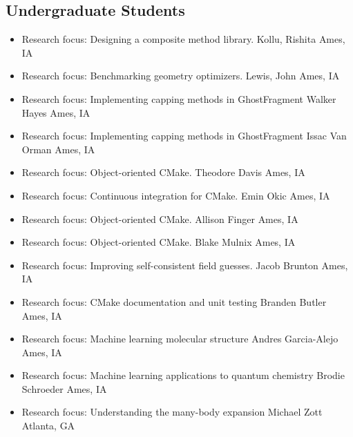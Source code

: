 \documentclass[11pt,a4paper,sans]{moderncv}
\begin{document}
\subsection{Undergraduate Students}
\begin{itemize}
	\item{
		{Research focus: Designing a composite method library.}
		{Kollu, Rishita}
		{Ames, IA}
		{}{}
	}
	\item{
		{Research focus: Benchmarking geometry optimizers.}
		{Lewis, John}
		{Ames, IA}
		{}{}
	}
	\item{
		{Research focus: Implementing capping methods in GhostFragment}
		{Walker Hayes}
		{Ames, IA}
		{}{}
	}
	\item{
		{Research focus: Implementing capping methods in GhostFragment}
		{Issac Van Orman}
		{Ames, IA}
		{}{}
	}
	\item{
		{Research focus: Object-oriented CMake.}
		{Theodore Davis}
		{Ames, IA}
		{}{}
	}
	\item{
		{Research focus: Continuous integration for CMake.}
		{Emin Okic}
		{Ames, IA}
		{}{}
	}
	\item{
		{Research focus: Object-oriented CMake.}
		{Allison Finger}
		{Ames, IA}
		{}{}
	}
	\item{
		{Research focus: Object-oriented CMake.}
		{Blake Mulnix}
		{Ames, IA}
		{}{}
	}
	\item{
		{Research focus: Improving self-consistent field guesses.}
		{Jacob Brunton}
		{Ames, IA}
		{}{}
	}
	\item{
		{Research focus: CMake documentation and unit testing}
		{Branden Butler}
		{Ames, IA}
		{}{}
	}
	\item{
		{Research focus: Machine learning molecular structure}
		{Andres Garcia-Alejo}
		{Ames, IA}
		{}{}
	}
	\item{
		{Research focus: Machine learning applications to quantum chemistry}
		{Brodie Schroeder}
		{Ames, IA}
		{}{}
	}
	\item{
		{Research focus: Understanding the many-body expansion}
		{Michael Zott}
		{Atlanta, GA}
		{}{}
	}
\end{itemize}
\end{document}
